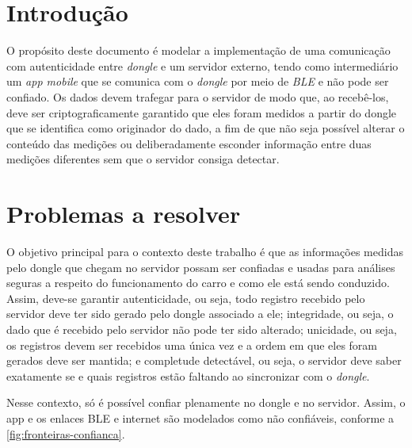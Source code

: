 \documentclass[
	12pt,
	article,			%
	oneside,
	a4paper,
	english,
	brazil				%
	]{abntex2}
\begin{document}
\frenchspacing

\begin{center}
	{\Large\bfseries\imprimirtitulo\par}
\end{center}
\vspace{1em}

\textual

\section{Introdução} \label{sec:intro}

O propósito deste documento é modelar a implementação de uma comunicação com autenticidade entre
\textit{dongle} e um servidor externo, tendo como intermediário um \textit{app mobile} que se comunica com o 
\textit{dongle} por meio de \textit{BLE} e não pode ser confiado. Os dados devem trafegar 
para o servidor de modo que, ao recebê-los, deve ser criptograficamente garantido que eles foram 
medidos a partir do dongle que se identifica como originador do dado, a fim de que não seja 
possível alterar o conteúdo das medições ou deliberadamente esconder informação entre duas medições
diferentes sem que o servidor consiga detectar.

\section{Problemas a resolver} \label{sec:solucao}

O objetivo principal para o contexto deste trabalho é que as informações medidas pelo dongle que 
chegam no servidor possam ser confiadas e usadas para análises seguras a respeito do
funcionamento do carro e como ele está sendo conduzido. Assim, deve-se garantir autenticidade,
ou seja, todo registro recebido pelo servidor deve ter sido gerado pelo dongle associado a ele;
integridade, ou seja, o dado que é recebido pelo servidor não pode ter sido alterado; unicidade, 
ou seja, os registros devem ser recebidos uma única vez e a ordem em que eles foram gerados deve
ser mantida; e completude detectável, ou seja, o servidor deve saber exatamente se e quais registros
estão faltando ao sincronizar com o \textit{dongle}.


Nesse contexto, só é possível confiar plenamente no dongle e no servidor. Assim, o app e os enlaces BLE
e internet são modelados como não confiáveis, conforme a \autoref{fig:fronteiras-confianca}.
\end{document}

